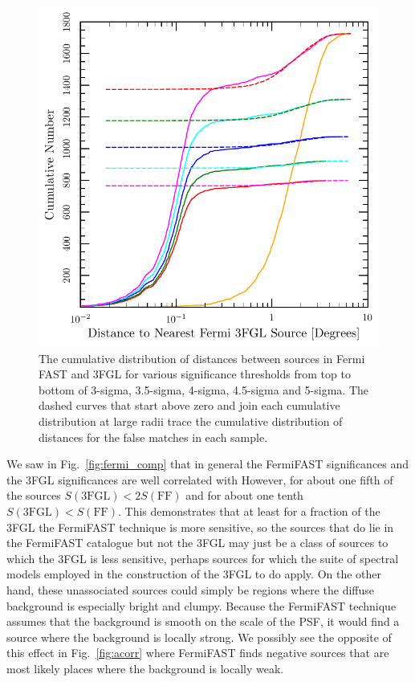\documentclass[useAMS,usenatbib]{mn2e}
\begin{document}
\begin{figure}
  \includegraphics[width=\columnwidth]{cumfflo_comp}
  \caption{The cumulative distribution of distances between sources in
    Fermi FAST and 3FGL for various significance thresholds from top
    to bottom of 3-sigma, 3.5-sigma, 4-sigma, 4.5-sigma and 5-sigma.
    The dashed curves that start above zero and join each cumulative
    distribution at large radii trace the cumulative distribution of
    distances for the false matches in each sample.}
  \label{fig:ffl_comp}
\end{figure}

We saw in Fig.~\ref{fig:fermi_comp} that in general the FermiFAST
significances and the 3FGL significances are well correlated with
However, for about one fifth of the sources $S(\mathrm{3FGL}) < 2 S(\mathrm{FF})$
and for about one tenth $S(\mathrm{3FGL}) < S(\mathrm{FF})$.
This demonstrates that at least for a fraction of
the 3FGL the FermiFAST technique is more sensitive, so the sources
that do lie in the FermiFAST catalogue but not the 3FGL may just be a
class of sources to which the 3FGL is less sensitive, perhaps sources
for which the suite of spectral models employed in the construction of
the 3FGL to do apply.  On the other hand, these unassociated sources
could simply be regions where the diffuse background is especially
bright and clumpy.  Because the FermiFAST technique assumes that the
background is smooth on the scale of the PSF, it would find a source
where the background is locally strong.  We possibly see the opposite
of this effect in Fig.~\ref{fig:acorr} where FermiFAST finds negative
sources that are most likely places where the background is locally
weak.
\end{document}
